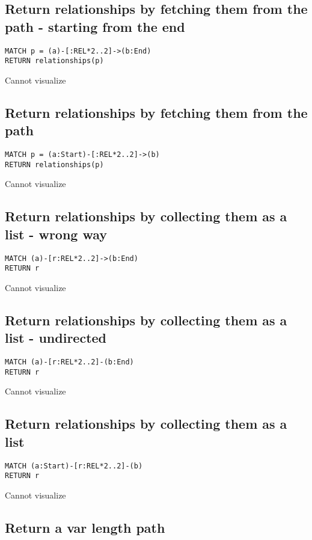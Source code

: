 \subsection{Return relationships by fetching them from the path - starting from the end}

\begin{lstlisting}
MATCH p = (a)-[:REL*2..2]->(b:End)
RETURN relationships(p)
\end{lstlisting}

Cannot visualize
\subsection{Return relationships by fetching them from the path}

\begin{lstlisting}
MATCH p = (a:Start)-[:REL*2..2]->(b)
RETURN relationships(p)
\end{lstlisting}

Cannot visualize
\subsection{Return relationships by collecting them as a list - wrong way}

\begin{lstlisting}
MATCH (a)-[r:REL*2..2]->(b:End)
RETURN r
\end{lstlisting}

Cannot visualize
\subsection{Return relationships by collecting them as a list - undirected}

\begin{lstlisting}
MATCH (a)-[r:REL*2..2]-(b:End)
RETURN r
\end{lstlisting}

Cannot visualize
\subsection{Return relationships by collecting them as a list}

\begin{lstlisting}
MATCH (a:Start)-[r:REL*2..2]-(b)
RETURN r
\end{lstlisting}

Cannot visualize
\subsection{Return a var length path}

